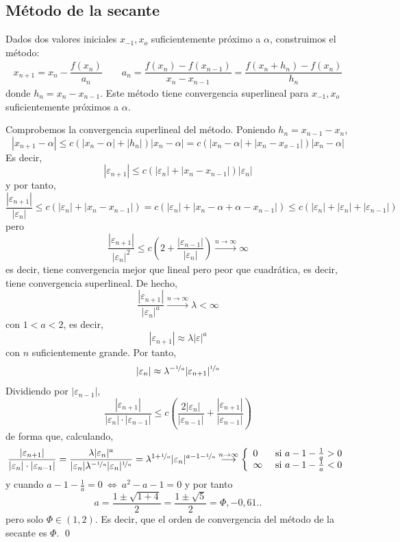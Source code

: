    \subsection{M{\'e}todo de la secante}
    \begin{met}
        Dados dos valores iniciales $x_{-1}, x_o$ suficientemente próximo a $\alpha$, construimos el método:
        \begin{align}
        x_{n+1}=x_n-\dfrac{f(x_n)}{a_n} \qquad  a_n=\dfrac{f(x_n)-f(x_{n-1})}{x_n-x_{n-1}}=\dfrac{f(x_n+h_n)-f(x_n)}{h_n}   
        \label{met:sec}
        \end{align}
        donde $h_n=x_n-x_{n-1}$. Este método tiene convergencia superlineal para $x_{-1}, x_o$ suficientemente próximos a $\alpha$.
    \end{met}
    \begin{dem}
        Comprobemos la convergencia superlineal del método. Poniendo $h_n=x_{n-1}-x_n$,
        $$|x_{n+1}-\alpha|\leq c(|x_n-\alpha|+|h_n|)|x_n-\alpha|=c(|x_n-\alpha|+|x_n-x_{x-1}|)|x_n-\alpha|$$
        Es decir, 
        $$|\varepsilon_{n+1}| \leq c (|\varepsilon_n|+|x_n-x_{n-1}|)|\varepsilon_n|$$
        y por tanto, 
        $$\dfrac{|\varepsilon_{n+1}|}{|\varepsilon_n|}\leq c(|\varepsilon_n|+|x_n-x_{n-1}|)=c(|\varepsilon_n|+|x_n-\alpha+\alpha-x_{n-1}|) \leq c(|\varepsilon_n|+|\varepsilon_n|+|\varepsilon_{n-1}|)$$
        pero 
        $$\dfrac{|\varepsilon_{n+1}|}{|\varepsilon_n|^2}\leq c\left(2+\dfrac{|\varepsilon_{n-1}|}{|\varepsilon_n|}\right) \overset{n \to \infty}{\longrightarrow} \infty$$
        es decir, tiene convergencia mejor que lineal pero peor que cuadrática, es decir, tiene convergencia superlineal. De hecho, 
        $$\dfrac{|\varepsilon_{n+1}|}{|\varepsilon_n|^a} \overset{n \to \infty}{\longrightarrow} \lambda < \infty$$
        con $1 < a < 2$, es decir, 
        $$|\varepsilon_{n+1}|\approx  \lambda |\varepsilon|^a$$
        con $n$ suficientemente grande. Por tanto, 
        $$|\varepsilon_n| \approx \lambda^{-\nicefrac{1}{a}} |\varepsilon_{n+1}|^{\nicefrac{1}{a}}$$
        Dividiendo por $|\varepsilon_{n-1}|$, 
        $$\dfrac{|\varepsilon_{n+1}|}{|\varepsilon_n| \cdot |\varepsilon_{n-1}|} \leq c \left(\dfrac{2|\varepsilon_n|}{|\varepsilon_{n-1}|}+\dfrac{|\varepsilon_{n+1}|}{|\varepsilon_{n-1}|} \right)$$
        de forma que, calculando, 
        $$\dfrac{|\varepsilon_{n+1}|}{|\varepsilon_n| \cdot |\varepsilon_{n-1}|}=\dfrac{\lambda |\varepsilon_n|^a}{|\varepsilon_n| \lambda^{-\nicefrac{1}{a}} |\varepsilon_n|^{\nicefrac{1}{a}}}=\lambda^{1+\nicefrac{1}{a}} |\varepsilon_n|^{a-1-\nicefrac{1}{a}} \overset{n \to \infty}{\longrightarrow} \left\{ \begin{array}{ll}
             0 & \text{ si } a-1-\frac{1}{a}>0 \\
             \infty & \text{ si } a-1-\frac{1}{a}<0
        \end{array}\right.$$
        y cuando $a-1-\frac{1}{a}=0 \: \iff \: a^2-a-1=0$ y por tanto
        $$a=\dfrac{1\pm\sqrt{1+4}}{2}=\dfrac{1\pm\sqrt{5}}{2}=\Phi, -0,61..$$
        pero solo $\Phi \in (1,2)$. Es decir, que el orden de convergencia del método de la secante es $\Phi$.
    \qed\end{dem}
